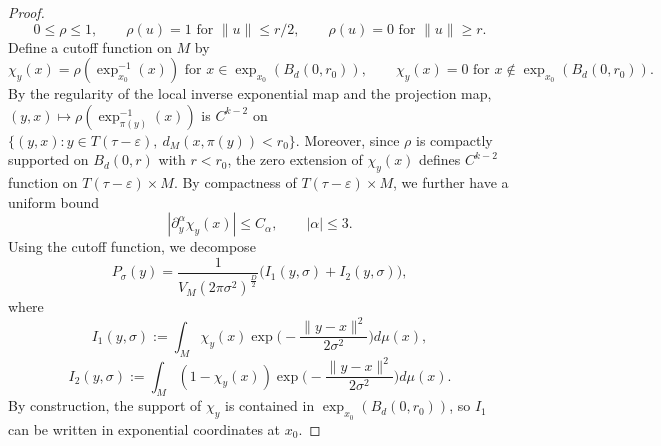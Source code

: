 \documentclass[11pt]{article}
\theoremstyle{plain}
\theoremstyle{definition}
\begin{document}
\begin{proof}
\[
0\le \rho \le 1,\qquad
\rho(u)=1 \text{ for } \|u\|\le r/2,\qquad
\rho(u)=0 \text{ for } \|u\|\ge r.
\]
Define a cutoff function on $M$ by
\[
\chi_y(x)= \rho(\exp_{x_0}^{-1}(x)) \text{ for } x\in \exp_{x_0}(B_d(0,r_0)),\qquad \chi_y(x)= 0 \text{ for } x\notin \exp_{x_0}( B_d(0,r_0)).
\]
By the regularity of the local inverse exponential map and the projection map, $(y,x)\mapsto \rho(\exp_{\pi(y)}^{-1}(x))$ is $C^{k-2}$ on $\{(y,x): y\in T(\tau-\varepsilon),\ d_M(x,\pi(y))< r_0\}$.
Moreover, since $\rho$ is compactly supported on $B_d(0,r)$ with $r<r_0$, the zero extension of $\chi_y(x)$ defines $C^{k-2}$ function on
$T(\tau-\varepsilon)\times M$.
By compactness of $T(\tau-\varepsilon)\times M$, we further have a uniform bound
\[
|\partial_y^\alpha \chi_y(x)|\le C_\alpha,\qquad |\alpha|\le 3.
\]
Using the cutoff function, we decompose
\[
P_\sigma(y)=\frac{1}{V_M(2\pi\sigma^2)^{\frac{D}{2}}}\big(I_1(y,\sigma)+I_2(y,\sigma)\big),
\]
where
\[
I_1(y,\sigma)
:=
\int_M \chi_y(x)\exp\big(-\frac{\|y-x\|^2}{2\sigma^2}\big)d\mu(x),
\]
\[
I_2(y,\sigma)
:=
\int_M (1-\chi_y(x))\exp\big(-\frac{\|y-x\|^2}{2\sigma^2}\big)d\mu(x).
\]
By construction, the support of $\chi_y$ is contained in $\exp_{x_0}(B_d(0,r_0))$, so $I_1$ can be written in exponential coordinates at $x_0$.


\end{proof}
\end{document}
